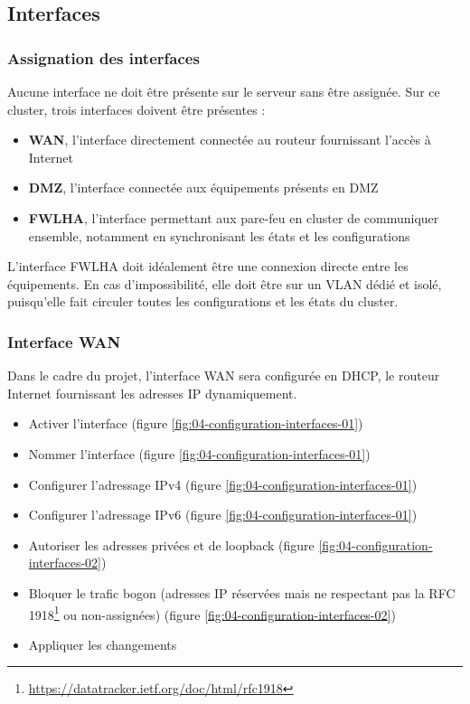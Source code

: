 \subsection{Interfaces}
\subsubsection{Assignation des interfaces}
Aucune interface ne doit être présente sur le serveur sans être assignée. Sur ce cluster, trois interfaces doivent être présentes :
\begin{itemize}
    \item \textbf{WAN}, l'interface directement connectée au routeur fournissant l'accès à Internet
    \item \textbf{DMZ}, l'interface connectée aux équipements présents en DMZ
    \item \textbf{FWLHA}, l'interface permettant aux pare-feu en cluster de communiquer ensemble, notamment en synchronisant les états et les configurations
\end{itemize}

\begin{warning}
    L'interface FWLHA doit idéalement être une connexion directe entre les équipements. En cas d'impossibilité, elle doit être sur un VLAN dédié et isolé, puisqu'elle fait circuler toutes les configurations et les états du cluster.
\end{warning}

\subsubsection{Interface WAN}
\begin{tip}
    Dans le cadre du projet, l'interface WAN sera configurée en DHCP, le routeur Internet fournissant les adresses IP dynamiquement.
\end{tip}

\begin{itemize}
    \item Activer l'interface (figure \ref{fig:04-configuration-interfaces-01})
    \item Nommer l'interface (figure \ref{fig:04-configuration-interfaces-01})
    \item Configurer l'adressage IPv4 (figure \ref{fig:04-configuration-interfaces-01})
    \item Configurer l'adressage IPv6 (figure \ref{fig:04-configuration-interfaces-01})
    \item Autoriser les adresses privées et de loopback (figure \ref{fig:04-configuration-interfaces-02})
    \item Bloquer le trafic bogon (adresses IP réservées mais ne respectant pas la RFC 1918\footnote{\url{https://datatracker.ietf.org/doc/html/rfc1918}} ou non-assignées) (figure \ref{fig:04-configuration-interfaces-02})
    \item Appliquer les changements
\end{itemize}

